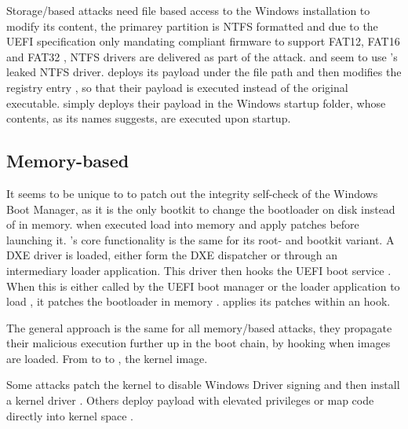 Storage\-/based attacks need file based access to the Windows installation to modify its content, the primarey partition is \ac{NTFS} formatted and due to the \ac{UEFI} specification only mandating compliant firmware to support \ac{FAT}12, \ac{FAT}16 and \ac{FAT}32 \cite[Section 13.3.1.1]{uefi-spec}, \ac{NTFS} drivers are delivered as part of the attack. \cite{mosaicregressor-technical-details} and \cite{lojax} seem to use \cite{vector-edk}'s leaked \ac{NTFS} driver. \cite{lojax} deploys its payload under the file path  and then modifies the registry entry , so that their payload is executed instead of the original executable. \cite{mosaicregressor-technical-details} simply deploys their payload in the Windows startup folder, whose contents, as its names suggests, are executed upon startup.

\subsection{Memory-based}

It seems to be unique to \cite{especter} to patch out the integrity self-check of the Windows Boot Manager, as it is the only bootkit to change the bootloader on disk instead of in memory.
\cite{finspy, dreamboot} when executed load  into memory and apply patches before launching it.
\cite{efiguard}'s core functionality is the same for its root- and bootkit variant.
A \ac{DXE} driver is loaded, either form the \ac{DXE} dispatcher or through an intermediary loader application.
This driver then hooks the \ac{UEFI} boot service . When this is either called by the \ac{UEFI} boot manager or the loader application to load , it patches the bootloader in memory \cite{efiguard}. \cite{moonbounce} applies its patches within an  hook.

The general approach is the same for all memory\-/based attacks, they propagate their malicious execution further up in the boot chain, by hooking when images are loaded. From  to  to , the kernel image.

Some attacks patch the kernel to disable Windows Driver signing and then install a kernel driver \cite{efiguard,especter}.
Others deploy payload with elevated privileges \cite{finspy, dreamboot} or map code directly into kernel space \cite{moonbounce,cosmicstrand}.